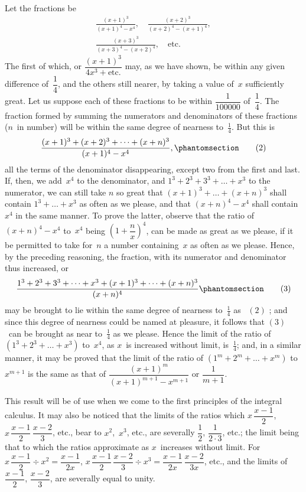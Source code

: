 \documentclass[12pt]{book}[2005/09/16]
\newcommand{\Chg}[2]{#2}
\newcommand{\Add}[1]{\Chg{}{#1}}
\newcounter{SecNo}
\newcommand{\Pagelabel}[1]{\phantomsection\label{page:#1}}
\newcommand{\PageSep}[1]{\Pagelabel{#1}\ignorespaces}
\renewcommand{\etc}{\text{etc}}
\renewcommand{\(}{{\upshape(}}
\renewcommand{\)}{{\upshape)}}
\newcommand{\Tag}[1]{%
  \phantomsection\label{eqn:\theSecNo.#1}\tag*{\ensuremath{#1}}%
}
\newcommand{\Eq}[2][\theSecNo]{%
  \hyperref[eqn:#1.#2]{\ensuremath{#2}}%
}
\begin{document}
Let the fractions be
\begin{gather*}
\frac{(x + 1)^{3}}{(x + 1)^{4} - x^{4}},\quad
\frac{(x + 2)^{3}}{(x + 2)^{4} - (x + 1)^{4}}, \\
\frac{(x + 3)^{3}}{(x + 3)^{4} - (x + 2)^{4}},\quad \etc.
\end{gather*}
The first of which, or $\dfrac{(x + 1)^{3}}{4x^{3} + \etc.}$ may, as we have
shown, be within any given difference of~$\dfrac{1}{4}$, and the
others still nearer, by taking a value of~$x$ sufficiently
great. Let us suppose each of these fractions to be
within $\dfrac{1}{100000}$ of~$\dfrac{1}{4}$. The fraction formed by summing
the numerators and denominators of these fractions
($n$~in number) will be within the same degree of
nearness to~$\frac{1}{4}$. But this is
\[
\frac{(x + 1)^{3} + (x + 2)^{3} + \dots + (x + n)^{3}}{(x + 1)^{4} - x^{4}}\Add{,}
\Tag{(2)}
\]
all the terms of the denominator disappearing, except
two from the first and last. If, then, we add~$x^{4}$ to
the denominator, and $1^{3} + 2^{3} + 3^{3} \Add{+} \dots + x^{3}$ to the numerator,
we can still take $n$ so great that $(x + 1)^{3} + \dots + (x + n)^{3}$
shall contain $1^{3} + \dots + x^{3}$ as often
as we please, and that $(x + n)^{4} - x^{4}$ shall contain~$x^{4}$
in the same manner. To prove the latter, observe
that the ratio of $(x + n)^{4} - x^{4}$ to~$x^{4}$ being $\left(1 + \dfrac{n}{x}\right)^{4}$,
can be made as great as we please, if it be permitted
\PageSep{73}
to take for~$n$ a number containing~$x$ as often as we
please. Hence, by the preceding reasoning, the fraction,
with its numerator and denominator thus increased,
or
\[
\frac{1^{3} + 2^{3} + 3^{3} + \dots + x^{3} + (x + 1)^{3} + \dots + (x + n)^{3}}
     {(x + n)^{4}}
\Tag{(3)}
\]
may be brought to lie within the same degree of nearness
to~$\frac{1}{4}$ as~\Eq{(2)}; and since this degree of nearness
could be named at pleasure, it follows that \Eq{(3)}~can
be brought as near to~$\frac{1}{4}$ as we please. Hence the
limit of the ratio of $(1^{3} + 2^{3} + \dots + x^{3})$ to~$x^{4}$, as $x$~is
increased without limit, is~$\frac{1}{4}$; and, in a similar manner,
it may be proved that the limit of the ratio of
$(1^{m} + 2^{m} + \dots + x^{m})$ to~$x^{m+1}$ is the same as that of
$\dfrac{(x + 1)^{m}}{(x + 1)^{m+1} - x^{m+1}}$ or $\dfrac{1}{m + 1}$.

This result will be of use when we come to the
first principles of the integral calculus. It may also
%
be noticed that the limits of the ratios which $x\, \dfrac{x - 1}{2}$,
$x\, \dfrac{x - 1}{2}\, \dfrac{x - 2}{3}$, etc., bear to $x^{2}$,~$x^{3}$, etc., are severally $\dfrac{1}{2}$,
$\dfrac{1}{2·3}$, etc.; the limit being that to which the ratios approximate
as $x$~increases without limit. For $x\, \dfrac{x - 1}{2} ÷ x^{2} = \dfrac{x - 1}{2x}$,
$x\, \dfrac{x - 1}{2}\, \dfrac{x - 2}{3} ÷ x^{3} = \dfrac{x - 1}{2x}\, \dfrac{x - 2}{3x}$, etc.,
and the limits of $\dfrac{x - 1}{2}$, $\dfrac{x - 2}{3}$, are severally equal to
unity.
\end{document}
